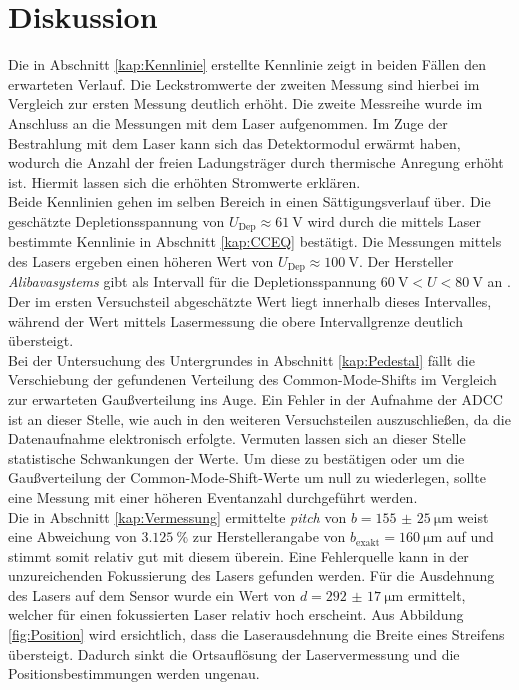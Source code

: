 \section{Diskussion}

Die in Abschnitt \ref{kap:Kennlinie} erstellte Kennlinie zeigt in beiden Fällen den erwarteten Verlauf. Die Leckstromwerte der zweiten Messung sind hierbei im Vergleich zur ersten Messung deutlich erhöht. Die zweite Messreihe wurde im Anschluss an die Messungen mit dem Laser aufgenommen. Im Zuge der Bestrahlung mit dem Laser kann sich das Detektormodul erwärmt haben, wodurch die Anzahl der freien Ladungsträger durch thermische Anregung erhöht ist. Hiermit lassen sich die erhöhten Stromwerte erklären.\\

Beide Kennlinien gehen im selben Bereich in einen Sättigungsverlauf über. Die geschätzte Depletionsspannung von $ U_{\mathrm{Dep}} \approx \SI{61}{\volt}$ wird durch die mittels Laser bestimmte Kennlinie in Abschnitt \ref{kap:CCEQ} bestätigt. Die Messungen mittels des Lasers ergeben einen höheren Wert von $ U_{\mathrm{Dep}} \approx \SI{100}{\volt}$. Der Hersteller \textit{Alibavasystems} gibt als Intervall für die Depletionsspannung $\SI{60}{\volt} < U < \SI{80}{\volt}$ an \cite{alibava}. Der im ersten Versuchsteil abgeschätzte Wert liegt innerhalb dieses Intervalles, während der Wert mittels Lasermessung die obere Intervallgrenze deutlich übersteigt.\\

Bei der Untersuchung des Untergrundes in Abschnitt \ref{kap:Pedestal} fällt die Verschiebung der gefundenen Verteilung des Common-Mode-Shifts im Vergleich zur erwarteten Gaußverteilung ins Auge. Ein Fehler in der Aufnahme der ADCC ist an dieser Stelle, wie auch in den weiteren Versuchsteilen auszuschließen, da die Datenaufnahme elektronisch erfolgte.
Vermuten lassen sich an dieser Stelle statistische Schwankungen der Werte. Um diese zu bestätigen oder um die Gaußverteilung der Common-Mode-Shift-Werte um null zu wiederlegen, sollte eine Messung mit einer höheren Eventanzahl durchgeführt werden.\\

Die in Abschnitt \ref{kap:Vermessung} ermittelte \textit{pitch} von $b = \SI{155(25)}{\micro\metre}$ weist eine Abweichung von $\SI{3.125}{\%}$ zur Herstellerangabe von $b_\mathrm{exakt} = \SI{160}{\micro\metre}$ auf \cite{alibava} und stimmt somit relativ gut mit diesem überein. Eine Fehlerquelle kann in der unzureichenden Fokussierung des Lasers gefunden werden. Für die Ausdehnung des Lasers auf dem Sensor wurde ein Wert von $d = \SI{292(17)}{\micro\metre}$ ermittelt, welcher für einen fokussierten Laser relativ hoch erscheint. Aus Abbildung \ref{fig:Position} wird ersichtlich, dass die Laserausdehnung die Breite eines Streifens übersteigt. Dadurch sinkt die Ortsauflösung der Laservermessung und die Positionsbestimmungen werden ungenau.\\

